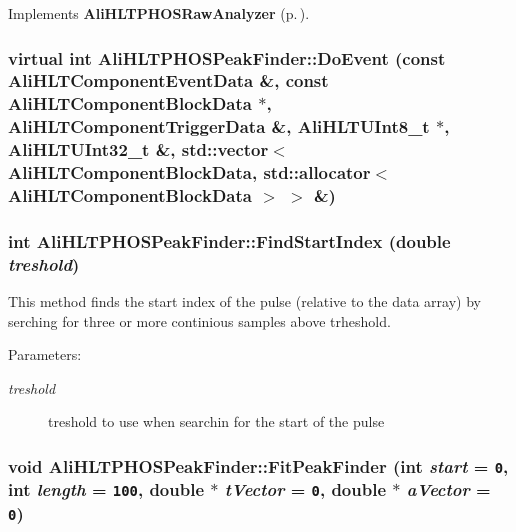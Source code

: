 Implements {\bf Ali\-HLTPHOSRaw\-Analyzer} {\rm (p.\,\pageref{classAliHLTPHOSRawAnalyzer_a9})}.
\subsubsection{\setlength{\rightskip}{0pt plus 5cm}virtual int Ali\-HLTPHOSPeak\-Finder::Do\-Event (const Ali\-HLTComponent\-Event\-Data \&, const Ali\-HLTComponent\-Block\-Data $\ast$, Ali\-HLTComponent\-Trigger\-Data \&, Ali\-HLTUInt8\_\-t $\ast$, Ali\-HLTUInt32\_\-t \&, std::vector$<$ Ali\-HLTComponent\-Block\-Data, std::allocator$<$ Ali\-HLTComponent\-Block\-Data $>$ $>$ \&)\hspace{0.3cm}{\tt  [inline, virtual]}}\label{classAliHLTPHOSPeakFinder_a14}


\subsubsection{\setlength{\rightskip}{0pt plus 5cm}int Ali\-HLTPHOSPeak\-Finder::Find\-Start\-Index (double {\em treshold})}\label{classAliHLTPHOSPeakFinder_a6}


This method finds the start index of the pulse (relative to the data array) by serching for three or more continious samples above trheshold. \begin{Desc}
\item[Parameters:]
\begin{description}
\item[{\em treshold}]treshold to use when searchin for the start of the pulse \end{description}
\end{Desc}
\subsubsection{\setlength{\rightskip}{0pt plus 5cm}void Ali\-HLTPHOSPeak\-Finder::Fit\-Peak\-Finder (int {\em start} = {\tt 0}, int {\em length} = {\tt 100}, double $\ast$ {\em t\-Vector} = {\tt 0}, double $\ast$ {\em a\-Vector} = {\tt 0})}\label{classAliHLTPHOSPeakFinder_a5}


